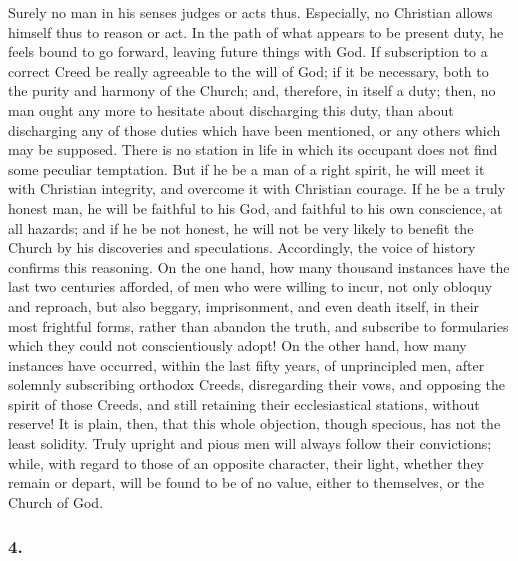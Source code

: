 \documentclass[
]{book}
\begin{document}
Surely no man in his senses judges or acts thus. Especially, no Christian allows himself thus to reason or act. In the path of what appears to be present duty, he feels bound to go forward, leaving future things with God. If subscription to a correct Creed be really agreeable to the will of God; if it be necessary, both to the purity and harmony of the Church; and, therefore, in itself a duty; then, no man ought any more to hesitate about discharging this duty, than about discharging any of those duties which have been mentioned, or any others which may be supposed. There is no station in life in which its occupant does not find some peculiar temptation. But if he be a man of a right spirit, he will meet it with Christian integrity, and overcome it with Christian courage. If he be a truly honest man, he will be faithful to his God, and faithful to his own conscience, at all hazards; and if he be not honest, he will not be very likely to benefit the Church by his discoveries and speculations. Accordingly, the voice of history confirms this reasoning. On the one hand, how many thousand instances have the last two centuries afforded, of men who were willing to incur, not only obloquy and reproach, but also beggary, imprisonment, and even death itself, in their most frightful forms, rather than abandon the truth, and subscribe to formularies which they could not conscientiously adopt! On the other hand, how many instances have occurred, within the last fifty years, of unprincipled men, after solemnly subscribing orthodox Creeds, disregarding their vows, and opposing the spirit of those Creeds, and still retaining their ecclesiastical stations, without reserve! It is plain, then, that this whole objection, though specious, has not the least solidity. Truly upright and pious men will always follow their convictions; while, with regard to those of an opposite character, their light, whether they remain or depart, will be found to be of no value, either to themselves, or the Church of God.

\hypertarget{section-10}{%
\subsubsection*{4.}\label{section-10}}
\end{document}
